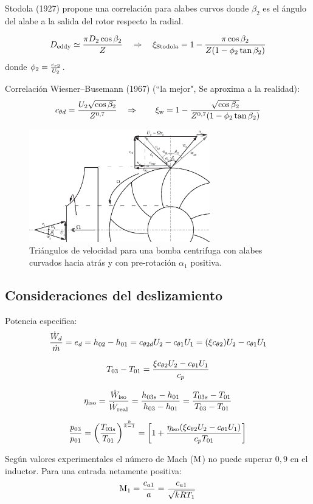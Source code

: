 \documentclass{article}
\begin{document}
Stodola (1927) propone una correlación para alabes curvos donde $\beta_2$ es el ángulo del alabe a la salida del rotor respecto la radial.

\[
D_{\mathrm{eddy}}\simeq \frac{\pi D_2\cos \beta_2}{Z} \quad\Rightarrow \quad \xi_{\mathrm{Stodola}} = 1-\frac{\pi \cos \beta_2}{Z(1-\phi_2 \tan \beta_2)}
\]
donde $\phi_2 =\frac{c_{r 2}}{U_2}$.

Correlación Wiesner--Busemann (1967) (``la mejor", Se aproxima a la realidad):
\[
c_{\theta d} =\frac{U_2\sqrt{\cos \beta_2}}{Z^{0,7}}
\quad\Rightarrow\qquad
\xi_{\mathrm{w}} = 1 - \frac{\sqrt{\cos \beta_2}}{Z^{0,7}(1-\phi_2\tan \beta_2)}
\]

\begin{figure}[htb!]
    \centering
    \includegraphics[width=0.7\textwidth]{fig/centrifugoVelocityTriangle.eps}
    \caption{Triángulos de velocidad para una bomba centrifuga con alabes curvados hacia atrás y con pre-rotación $\alpha_1$ positiva. }
    \label{fig:my_label}
\end{figure}
\subsection{Consideraciones del deslizamiento}
Potencia especifica:
\[
\frac{\dot{W}_d}{\dot{m}}=e_d = h_{02}-h_{01}=c_{\theta 2d} U_2 - c_{\theta 1} U_1 = (\xi c_{\theta 2})U_2 - c_{\theta 1} U_1
\]

\[
T_{03}-T_{01} = \frac{\xi c_{\theta 2}U_2-c_{\theta 1}U_1}{c_p}
\]

\[
\eta_{\mathrm{iso}} = \frac{\dot{W}_{\mathrm{iso}}}{\dot{W}_{\mathrm{real}}} = \frac{h_{03s}-h_{01}}{h_{03}-h_{01}}= \frac{T_{03s}-T_{01}}{T_{03}-T_{01}}
\]

\[
\frac{p_{03}}{p_{01}}= \left( \frac{T_{03s}}{T_{01}}\right)^{\frac{k}{k-1}} =\left[ 1+ \frac{\eta_{\mathrm{iso}} (\xi c_{\theta 2}U_2 - c_{\theta 1}U_1)}{c_p T_{01}} \right]
\]

Según valores experimentales el número de Mach ($\textrm{M}$) no puede superar $0,9$ en el inductor. Para una entrada netamente positiva:
\[
\textrm{M}_1 = \frac{c_{a 1}}{a} = \frac{c_{a 1}}{\sqrt{k R T_1}}
\]
\end{document}
